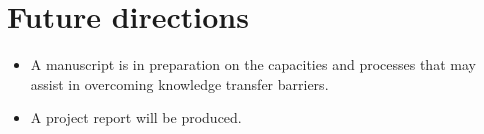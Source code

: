 \documentclass[version=last,
    paper=a4, %
    10pt, %
    usenames,
    dvipsnames,
    oneside, %
    headings=openany, %
    DIV=15 %
]{scrbook}
\begin{document}
\section*{Future directions}
\begin{itemize}
\itemsep1pt\parskip0pt
\item
  A manuscript is in preparation on the capacities and processes that
  may assist in overcoming knowledge transfer barriers.~
\item
  A project report will be produced.
\end{itemize}



\end{document}
